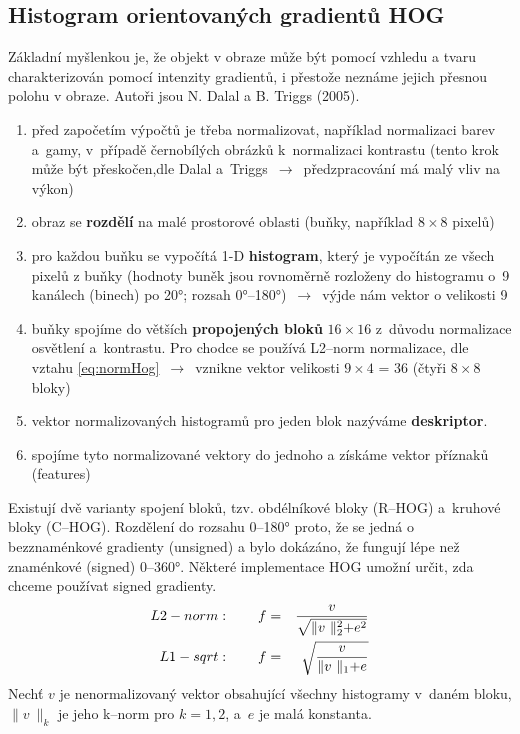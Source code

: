 \subsection{Histogram orientovaných gradientů HOG}

Základní myšlenkou je, že objekt v obraze může být pomocí vzhledu a tvaru charakterizován pomocí intenzity gradientů, i přestože neznáme jejich přesnou polohu v obraze. Autoři jsou N. Dalal a B. Triggs (2005).
\begin{enumerate}
  \item před započetím výpočtů je třeba normalizovat, například normalizaci barev a~gamy, v~případě černobílých obrázků k~normalizaci kontrastu (tento krok může být přeskočen,dle Dalal a~Triggs $\,\to\,$ předzpracování má malý vliv na výkon)
  \item obraz se \textbf{rozdělí} na malé prostorové oblasti (buňky, například $8 \times 8$ pixelů)
  \item pro každou buňku se vypočítá 1-D \textbf{histogram}, který je vypočítán ze všech pixelů z buňky (hodnoty buněk jsou rovnoměrně rozloženy do histogramu o~9 kanálech (binech) po \ang{20}; rozsah \ang{0}--\ang{180})  $\,\to\,$ výjde nám vektor o velikosti 9
  \item buňky spojíme do větších \textbf{propojených bloků} $16 \times 16$ z~důvodu normalizace osvětlení a~kontrastu. Pro chodce se používá L2--norm normalizace, dle vztahu \eqref{eq:normHog} $\,\to\,$ vznikne vektor velikosti $9\times4$ = 36 (čtyři $8 \times 8$ bloky)
  \item vektor normalizovaných histogramů pro jeden blok nazýváme \textbf{deskriptor}.
  \item spojíme tyto normalizované vektory do jednoho a získáme  vektor příznaků (features)
\end{enumerate}
Existují dvě varianty spojení bloků, tzv. obdélníkové bloky (R--HOG) a~kruhové bloky (C--HOG).
Rozdělení do rozsahu 0--\ang{180} proto, že se jedná o bezznaménkové gradienty (unsigned) a bylo dokázáno, že fungují lépe než znaménkové (signed) 0--\ang{360}. Některé implementace HOG umožní určit, zda chceme používat signed gradienty.
\begin{equation}
\centering
 \label{eq:normHog}
 \begin{aligned}
L2-norm&: \qquad  f =& \frac{v}{\sqrt{\lVert v~\lVert_2^2 + e^2}} \\
L1-sqrt&: \qquad  f =& \sqrt{\frac{v}{\lVert v~\lVert_1 + e}}
 \end{aligned}
\end{equation}
Nechť $v$ je nenormalizovaný vektor obsahující všechny histogramy v~daném bloku, $\lVert v~\lVert_k$ je jeho k--norm pro $k = 1,2$, a~$e$ je malá konstanta.

